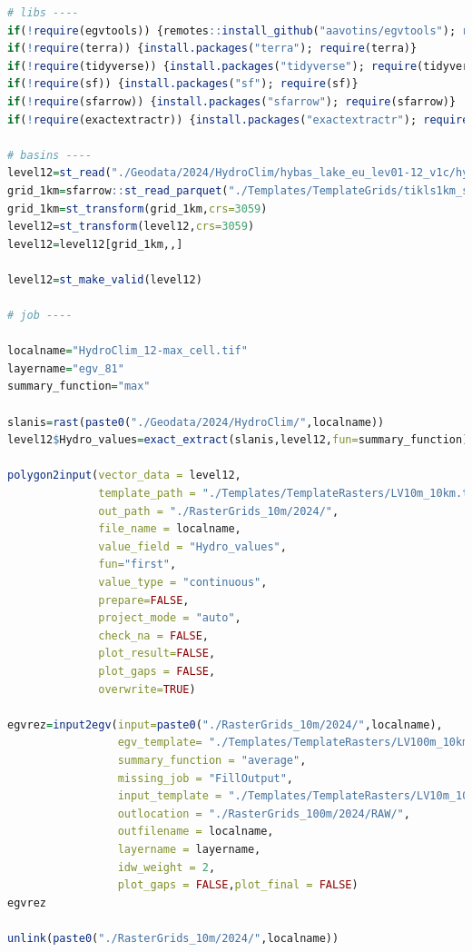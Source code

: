 \documentclass[
]{book}
\begin{document}
\begin{lstlisting}[language=R]
# libs ----
if(!require(egvtools)) {remotes::install_github("aavotins/egvtools"); require(egvtools)}
if(!require(terra)) {install.packages("terra"); require(terra)}
if(!require(tidyverse)) {install.packages("tidyverse"); require(tidyverse)}
if(!require(sf)) {install.packages("sf"); require(sf)}
if(!require(sfarrow)) {install.packages("sfarrow"); require(sfarrow)}
if(!require(exactextractr)) {install.packages("exactextractr"); require(exactextractr)}

# basins ----
level12=st_read("./Geodata/2024/HydroClim/hybas_lake_eu_lev01-12_v1c/hybas_lake_eu_lev12_v1c.shp")
grid_1km=sfarrow::st_read_parquet("./Templates/TemplateGrids/tikls1km_sauzeme.parquet")
grid_1km=st_transform(grid_1km,crs=3059)
level12=st_transform(level12,crs=3059)
level12=level12[grid_1km,,]

level12=st_make_valid(level12)

# job ----

localname="HydroClim_12-max_cell.tif"
layername="egv_81"
summary_function="max"
  
slanis=rast(paste0("./Geodata/2024/HydroClim/",localname))
level12$Hydro_values=exact_extract(slanis,level12,fun=summary_function)
  
polygon2input(vector_data = level12,
              template_path = "./Templates/TemplateRasters/LV10m_10km.tif",
              out_path = "./RasterGrids_10m/2024/",
              file_name = localname,
              value_field = "Hydro_values",
              fun="first",
              value_type = "continuous",
              prepare=FALSE,
              project_mode = "auto",
              check_na = FALSE,
              plot_result=FALSE,
              plot_gaps = FALSE,
              overwrite=TRUE)
  
egvrez=input2egv(input=paste0("./RasterGrids_10m/2024/",localname),
                 egv_template= "./Templates/TemplateRasters/LV100m_10km.tif",
                 summary_function = "average",
                 missing_job = "FillOutput",
                 input_template = "./Templates/TemplateRasters/LV10m_10km.tif",
                 outlocation = "./RasterGrids_100m/2024/RAW/",
                 outfilename = localname,
                 layername = layername,
                 idw_weight = 2,
                 plot_gaps = FALSE,plot_final = FALSE)
egvrez
  
unlink(paste0("./RasterGrids_10m/2024/",localname))
\end{lstlisting}
\end{document}

